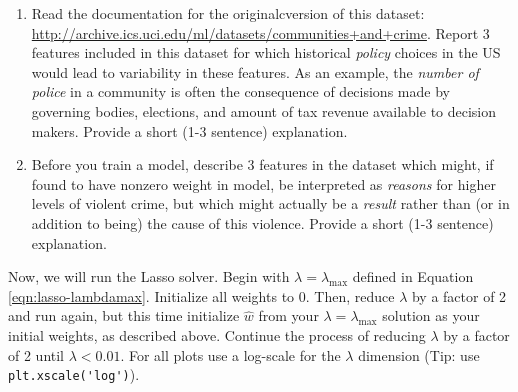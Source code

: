 \documentclass{article}
\begin{document}
\begin{sloppypar}
\begin{aprob}
    \begin{enumerate}
        \item {} Read the documentation for the originalcversion of this dataset: \url{http://archive.ics.uci.edu/ml/datasets/communities+and+crime}. Report 3 features included in this dataset for which historical \emph{policy} choices in the US would lead to variability in these features. As an example, the \emph{number of police} in a community is often the consequence of decisions made by governing bodies, elections, and amount of tax revenue available to decision makers. Provide a short (1-3 sentence) explanation.
        \item {} Before you train a model, describe 3 features in the dataset which might, if found to have nonzero weight in model, be interpreted as \emph{reasons} for higher levels of violent crime, but which might actually be a \emph{result} rather than (or in addition to being) the cause of this violence. Provide a short (1-3 sentence) explanation.
    \end{enumerate}

    Now, we will run the Lasso solver. Begin with $\lambda = \lambda_{\max}$ defined in Equation \eqref{eqn:lasso-lambdamax}. 
    Initialize all weights to $0$. Then, reduce $\lambda$ by a factor of 2 and run again, but this time initialize $\hat{{w}}$ from your $\lambda = \lambda_{\max}$ solution as your initial weights, as described above. Continue the process of reducing $\lambda$ by a factor of 2 until $\lambda < 0.01$.
    For all plots use a log-scale for the $\lambda$ dimension (Tip: use
    \verb|plt.xscale('log')|).
    \\ 
    

\end{aprob}
\end{sloppypar}
\end{document}
